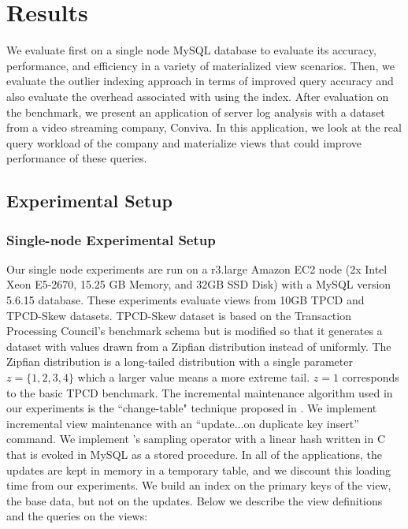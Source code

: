 \section{Results}
\label{exp}
We evaluate \svc first on a single node MySQL database to evaluate its accuracy, performance, and efficiency in a variety of materialized view 
scenarios.
Then, we evaluate the outlier indexing approach in terms of improved query accuracy and also evaluate the overhead associated with using the index.
After evaluation on the benchmark, we present an application of server log analysis with a dataset from a video streaming company, Conviva.
In this application, we look at the real query workload of the company and materialize views that could improve performance of these queries.

\subsection{Experimental Setup} %
\subsubsection{Single-node Experimental Setup}
Our single node experiments are run on a r3.large Amazon EC2 node (2x Intel Xeon E5-2670, 15.25 GB Memory, and 32GB SSD Disk) with a MySQL version 5.6.15 database.
These experiments evaluate views from 10GB TPCD and TPCD-Skew datasets.
TPCD-Skew dataset \cite{tpcdskew} is based on the Transaction Processing Council's benchmark
schema but is modified so that it generates a dataset with values drawn from a Zipfian distribution instead of uniformly.
The Zipfian distribution \cite{mitzenmacher2004brief} is a long-tailed distribution with a single parameter $z=\{1,2,3,4\}$ which a larger
value means a more extreme tail.
$z=1$ corresponds to the basic TPCD benchmark. 
The incremental maintenance algorithm used in our experiments is the ``change-table" technique proposed in \cite{gupta2006incremental}.
We implement incremental view maintenance with an ``update...on duplicate key insert'' command.
We implement \svc's sampling operator with a linear hash written in C that is evoked in MySQL as a stored procedure.
In all of the applications, the updates are kept in memory in a temporary table, and we discount this loading time from our experiments.
We build an index on the primary keys of the view, the base data, but not on the updates.
Below we describe the view definitions and the queries on the views:

